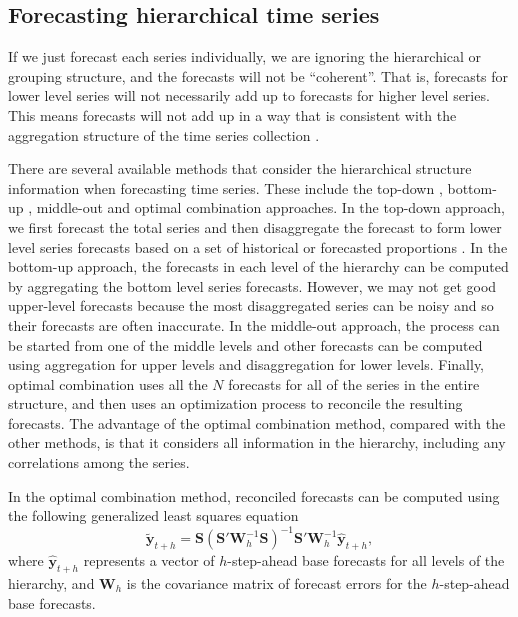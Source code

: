 \documentclass[11pt,a4paper,]{article}
\begin{document}
\hypertarget{forecasting-hierarchical-time-series}{%
\subsection{Forecasting hierarchical time series}\label{forecasting-hierarchical-time-series}}

If we just forecast each series individually, we are ignoring the hierarchical or grouping structure, and the forecasts will not be ``coherent''. That is, forecasts for lower level series will not necessarily add up to forecasts for higher level series. This means forecasts will not add up in a way that is consistent with the aggregation structure of the time series collection \autocite{fpp2}.

There are several available methods that consider the hierarchical structure information when forecasting time series. These include the top-down \autocite{gross1990disaggregation,fliedner2001hierarchical}, bottom-up \autocite{kahn1998revisiting}, middle-out and optimal combination \autocite{hyndman2011optimal} approaches. In the top-down approach, we first forecast the total series and then disaggregate the forecast to form lower level series forecasts based on a set of historical or forecasted proportions \autocite[for details see][]{athanasopoulos2009hierarchical}. In the bottom-up approach, the forecasts in each level of the hierarchy can be computed by aggregating the bottom level series forecasts. However, we may not get good upper-level forecasts because the most disaggregated series can be noisy and so their forecasts are often inaccurate. In the middle-out approach, the process can be started from one of the middle levels and other forecasts can be computed using aggregation for upper levels and disaggregation for lower levels. Finally, optimal combination uses all the \(N\) forecasts for all of the series in the entire structure, and then uses an optimization process to reconcile the resulting forecasts. The advantage of the optimal combination method, compared with the other methods, is that it considers all information in the hierarchy, including any correlations among the series.

In the optimal combination method, reconciled forecasts can be computed using the following generalized least squares equation \autocite{mint2018}
\begin{equation}\label{eq:mint}
  \tilde{\bm{y}}_{t+h}=\bm{S}(\bm{S}'\bm{W}_{h}^{-1}\bm{S})^{-1}\bm{S}'\bm{W}_{h}^{-1}\hat{\bm{y}}_{t+h},
\end{equation}
where \(\hat{\bm{y}}_{t+h}\) represents a vector of \(h\)-step-ahead base forecasts for all levels of the hierarchy, and \(\bm{W}_{h}\) is the covariance matrix of forecast errors for the \(h\)-step-ahead base forecasts.
\end{document}
